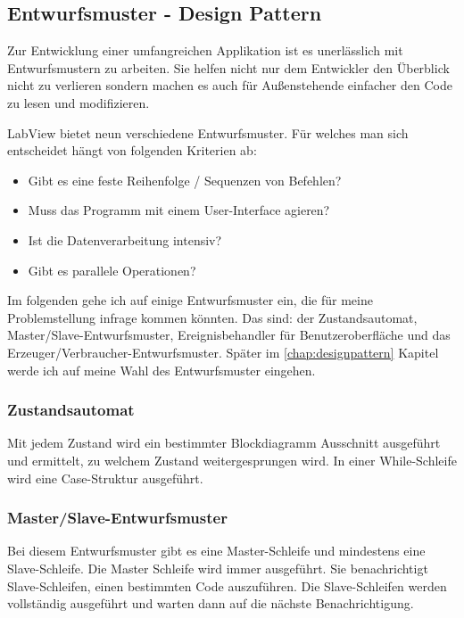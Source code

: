 	\subsection{Entwurfsmuster - Design Pattern}
	\label{chap:entwurfsmuster}
Zur Entwicklung einer umfangreichen Applikation ist es unerlässlich mit Entwurfsmustern zu arbeiten. Sie helfen nicht nur dem Entwickler den Überblick nicht zu verlieren sondern machen es auch für Außenstehende einfacher den Code zu lesen und modifizieren.

LabView bietet neun verschiedene Entwurfsmuster. Für welches man sich entscheidet hängt von folgenden Kriterien ab:
\begin{itemize}
	\item Gibt es eine feste Reihenfolge / Sequenzen von Befehlen?
	\item Muss das Programm mit einem User-Interface agieren?
	\item Ist die Datenverarbeitung intensiv? 
	\item Gibt es parallele Operationen?
\end{itemize}

Im folgenden gehe ich auf einige Entwurfsmuster ein, die für meine Problemstellung infrage kommen könnten. Das sind: der Zustandsautomat, Master/Slave-Entwurfsmuster, Ereignisbehandler für Benutzeroberfläche und das Erzeuger/Verbraucher-Entwurfsmuster. Später im \ref{chap:designpattern} Kapitel werde ich auf meine Wahl des Entwurfsmuster eingehen.

\subsubsection{Zustandsautomat}%
Mit jedem Zustand wird ein bestimmter Blockdiagramm Ausschnitt ausgeführt und ermittelt, zu welchem Zustand weitergesprungen wird. In einer While-Schleife wird eine Case-Struktur ausgeführt. 
	
\subsubsection{Master/Slave-Entwurfsmuster}
Bei diesem Entwurfsmuster gibt es eine Master-Schleife und mindestens eine Slave-Schleife. Die Master Schleife wird immer ausgeführt. Sie benachrichtigt Slave-Schleifen, einen bestimmten Code auszuführen. Die Slave-Schleifen werden vollständig ausgeführt und warten dann auf die nächste Benachrichtigung.

